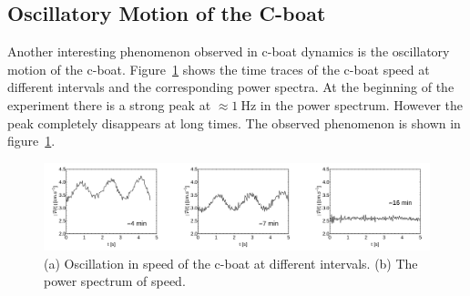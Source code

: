 \documentclass[aps, twocolumn, floatfix, superscriptaddress]{revtex4}
\begin{document}
\subsection{Oscillatory Motion of the C-boat}
\label{sec:movingc-boat}
Another interesting phenomenon observed in c-boat dynamics is the oscillatory motion of the c-boat. Figure~\ref{fig:absvnosds} shows the time traces of the c-boat speed at different intervals and the corresponding power spectra. At the beginning of the experiment there is a strong peak at $\approx 1\ \mathrm{Hz}$ in the power spectrum. However the peak completely disappears at long times. The observed phenomenon is shown in figure~\ref{fig:absvnosds}.   
\begin{figure}[ht]
    \begin{center}
       \includegraphics[scale=0.1]{figure7.pdf}
    \end{center}
    \caption{(a) Oscillation in speed of the c-boat at different intervals. (b) The power spectrum of speed.}
    \label{fig:absvnosds}
\end{figure}
\end{document}
